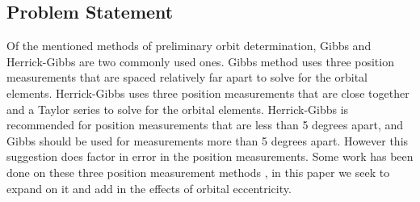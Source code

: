 \documentclass[12pt]{article}
\begin{document}
		\subsection{Problem Statement}
		Of the mentioned methods of preliminary orbit determination, Gibbs and Herrick-Gibbs are two commonly used ones. Gibbs method uses three position measurements that are spaced relatively far apart to solve for the orbital elements. Herrick-Gibbs uses three position measurements that are close together and a Taylor series to solve for the orbital elements. Herrick-Gibbs is recommended for position measurements that are less than 5 degrees apart, and Gibbs should be used for measurements more than 5 degrees apart\cite{vallado2007fundamentals}. However this suggestion does factor in error in the position measurements. Some work has been done on these three position measurement methods \cite{Kaushick}, in this paper we seek to expand on it and add in the effects of orbital eccentricity.
		
		
		
		

\end{document}
